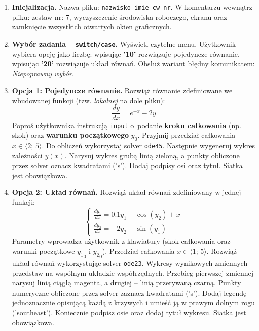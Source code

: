 \documentclass[a4paper,11pt]{article}
\begin{document}
\begin{enumerate}[leftmargin=*, label=\textbf{\arabic*.}, itemsep=2pt]

  \item \textbf{Inicjalizacja.}
    Nazwa pliku: \texttt{nazwisko\_imie\_cw\_nr}. W komentarzu wewnątrz pliku: zestaw nr: 7, wyczyszczenie środowiska roboczego, ekranu oraz zamknięcie wszystkich otwartych okien graficznych.

  \item \textbf{Wybór zadania -- \texttt{switch/case}.}
    Wyświetl czytelne menu. Użytkownik wybiera opcję jako liczbę: wpisując \textbf{'10'} rozwiązuje pojedyncze równanie, wpisując \textbf{'20'} rozwiązuje układ równań. Obsłuż wariant błędny komunikatem: \textit{Niepoprawny wybór}.

  \item \textbf{Opcja 1: Pojedyncze równanie.}
    Rozwiąż równanie zdefiniowane we wbudowanej funkcji (tzw. \textit{lokalnej} na dole pliku):
    \[ \frac{dy}{dx} = e^{-x} - 2y \]
    Poproś użytkownika instrukcją \texttt{input} o~podanie \textbf{kroku całkowania} (np. skok) oraz \textbf{warunku początkowego} $y_0$. Przyjmij przedział całkowania $x \in \langle 2;\,5 \rangle$.
    Do obliczeń wykorzystaj solver \texttt{ode45}. Następnie wygeneruj wykres zależności $y(x)$. Narysuj wykres grubą linią zieloną, a punkty obliczone przez solver oznacz kwadratami ('s'). Dodaj podpisy osi oraz tytuł. Siatka jest obowiązkowa.

  \item \textbf{Opcja 2: Układ równań.}
    Rozwiąż układ równań zdefiniowany w jednej funkcji:\\[-0.5em]
    \[
    \begin{cases}
      \frac{dy_1}{dx} = 0.1y_1 - \cos(y_2) + x \\
      \frac{dy_2}{dx} = -2y_2 + \sin(y_1)
    \end{cases}
    \]
    Parametry wprowadza użytkownik z klawiatury (skok całkowania oraz warunki początkowe $ {y_1}_{0} $ i $ {y_2}_{0} $). Przedział całkowania $x \in \langle 1;\,5 \rangle$.
    Rozwiąż układ równań wykorzystując solver \texttt{ode23}. Wykresy wynikowych zmiennych przedstaw na wspólnym układzie współrzędnych. Przebieg pierwszej zmiennej narysuj linią ciągłą magenta, a drugiej -- linią przerywaną czarną. Punkty numeryczne obliczone przez solver zaznacz kwadratami ('s'). Dodaj legendę jednoznacznie opisującą każdą z krzywych i umieść ją w prawym dolnym rogu ('southeast'). Koniecznie podpisz osie oraz dodaj tytuł wykresu. Siatka jest obowiązkowa.

\end{enumerate}
\end{document}
